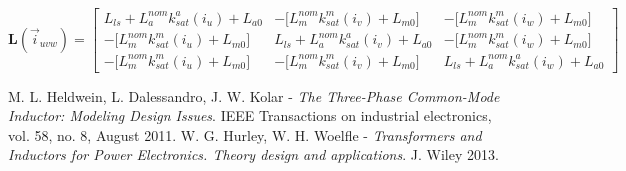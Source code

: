 \documentclass[11pt,a4paper]{scrartcl}
\numberwithin{equation}{section}
\theoremstyle{it}
\theoremstyle{definition}
\begin{document}
\begin{onehalfspace}
	
	\begin{equation}
		\mathbf{L}(\vec{i}_{uvw}) = \begin{bmatrix} L_{ls}+L_a^{nom} k_{sat}^{a}(i_u) + L_{a0} & -\big[L_m^{nom} k_{sat}^{m}(i_v) + L_{m0}\big] & -\big[L_m^{nom} k_{sat}^{m}(i_w) + L_{m0}\big] \\[6pt] -\big[L_m^{nom} k_{sat}^{m}(i_u) + L_{m0}\big] & L_{ls}+L_a^{nom} k_{sat}^{a}(i_v) + L_{a0} & -\big[L_m^{nom} k_{sat}^{m}(i_w) + L_{m0}\big] \\[6pt] -\big[L_m^{nom} k_{sat}^{m}(i_u) + L_{m0}\big] & -\big[L_m^{nom} k_{sat}^{m}(i_v) + L_{m0}\big] & L_{ls}+L_a^{nom} k_{sat}^{a}(i_w) + L_{a0} \end{bmatrix}
	\end{equation}
	
	\newpage
	\begin{thebibliography}{9}
		M. L. Heldwein, L. Dalessandro, J. W. Kolar - \emph{The Three-Phase Common-Mode Inductor: Modeling Design Issues}. IEEE Transactions on industrial electronics, vol. 58, no. 8, August 2011.
		W. G. Hurley, W. H. Woelfle - \emph{Transformers and Inductors for Power Electronics. Theory design and applications}. J. Wiley 2013.
	\end{thebibliography}
	
\end{onehalfspace}
\end{document}
